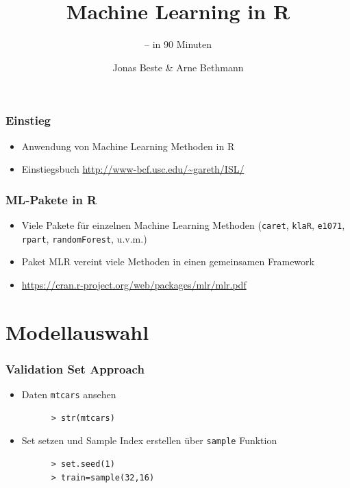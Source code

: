 \documentclass{beamer}
\title{Machine Learning in R}
\subtitle{-- in 90 Minuten}
\author{Jonas Beste \& Arne Bethmann}
\begin{document}
\begin{frame}
  \titlepage
\end{frame}

\begin{frame}
  \frametitle{Einstieg}
  \begin{itemize}
    \item Anwendung von Machine Learning Methoden in R
    \item Einstiegsbuch \url{http://www-bcf.usc.edu/~gareth/ISL/}
  \end{itemize}
\end{frame}

\begin{frame}
  \frametitle{ML-Pakete in R}
  \begin{itemize}
    \item Viele Pakete für einzelnen Machine Learning Methoden (\Verb+caret+, \Verb+klaR+,  \Verb+e1071+, \Verb+rpart+, \Verb+randomForest+, u.v.m.)
    \item Paket MLR vereint viele Methoden in einen gemeinsamen Framework
    \item \url{https://cran.r-project.org/web/packages/mlr/mlr.pdf}
  \end{itemize}
\end{frame}

\section{Modellauswahl}

\begin{frame}[fragile]
  \frametitle{Validation Set Approach}
  \begin{itemize}
    \item Daten \Verb+mtcars+ ansehen
    \begin{Verbatim}
      > str(mtcars)
    \end{Verbatim}
        \item Set setzen und Sample Index erstellen über \Verb+sample+ Funktion
    \begin{Verbatim}
      > set.seed(1)
      > train=sample(32,16)
    \end{Verbatim}
  \end{itemize}
\end{frame}
\end{document}
